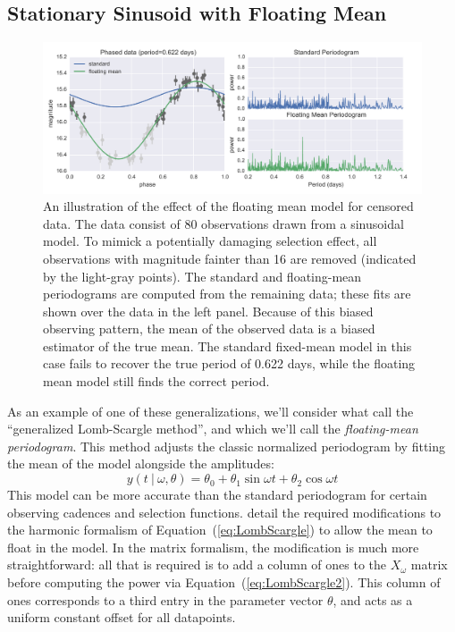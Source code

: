 \documentclass[12pt,preprint]{aastex}
\newcommand{\figlabel}[1]{\label{fig:#1}}
\newcommand{\Eq}[1]{Equation~(\ref{eq:#1})}
\newcommand{\eq}[1]{\Eq{#1}}
\newcommand{\sectlabel}[1]{\label{sect:#1}}
\begin{document}
\subsection{Stationary Sinusoid with Floating Mean}
\sectlabel{floating_mean}

\begin{figure}
  \centering
  \includegraphics[width=\textwidth]{fig02.pdf}
  \caption{
    An illustration of the effect of the floating mean model for censored data.
    The data consist of 80 observations drawn from a sinusoidal model. To mimick a potentially damaging selection effect, all observations with magnitude fainter than 16 are removed (indicated by the light-gray points). The standard and floating-mean periodograms are computed from the remaining data; these fits are shown over the data in the left panel. Because of this biased observing pattern, the mean of the observed data is a biased estimator of the true mean. The standard fixed-mean model in this case fails to recover the true period of 0.622 days, while the floating mean model still finds the correct period.
  }
  \figlabel{floating_mean}
\end{figure}

As an example of one of these generalizations, we'll consider what \citet{Zechmeister09} call the ``generalized Lomb-Scargle method'', and which we'll call the {\it floating-mean periodogram}. This method adjusts the classic normalized periodogram by fitting the mean of the model alongside the amplitudes:
\begin{equation}
  y(t~|~\omega, \theta) = \theta_0 + \theta_1\sin\omega t + \theta_2\cos\omega t
\end{equation}
This model can be more accurate than the standard periodogram for certain observing cadences and selection functions. \citet{Zechmeister09} detail the required modifications to the harmonic formalism of \eq{LombScargle} to allow the mean to float in the model. In the matrix formalism, the modification is much more straightforward: all that is required is to add a column of ones to the $X_\omega$ matrix before computing the power via \eq{LombScargle2}. This column of ones corresponds to a third entry in the parameter vector $\theta$, and acts as a uniform constant offset for all datapoints.
\end{document}
